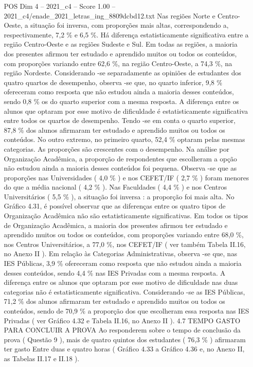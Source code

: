 \begin{textsample}{POS Dim 4 – 2021\_c4 – Score 1.00 – 2021\_c4/enade\_2021\_letras\_ing\_8809dcbd12.txt}
Nas regiões Norte e Centro-Oeste, a situação foi inversa, com proporções mais altas, correspondendo a, respectivamente, 7,2 \% e 6,5 \%.
Há diferença estatisticamente significativa entre a região Centro-Oeste e as regiões Sudeste e Sul.
Em todas as regiões, a maioria dos presentes afirmou ter estudado e aprendido muitos ou todos os conteúdos, com proporções variando entre 62,6 \%, na região Centro-Oeste, a 74,3 \%, na região Nordeste.
Considerando -se separadamente as opiniões de estudantes dos quatro quartos de desempenho, observa -se que, no quarto inferior, 9,8 \% ofereceram como resposta que não estudou ainda a maioria desses conteúdos, sendo 0,8 \% os do quarto superior com a mesma resposta.
A diferença entre os alunos que optaram por esse motivo de dificuldade é estatisticamente significativa entre todos os quartos de desempenho.
Tendo -se em conta o quarto superior, 87,8 \% dos alunos afirmaram ter estudado e aprendido muitos ou todos os conteúdos.
No outro extremo, no primeiro quarto, 52,4 \% optaram pelas mesmas categorias.
As proporções são crescentes com o desempenho.
Na análise por Organização Acadêmica, a proporção de respondentes que escolheram a opção não estudou ainda a maioria desses conteúdos foi pequena.
Observa -se que as proporções nas Universidades ( 4,0 \% ) e nos CEFET/IF ( 2,7 \% ) foram menores do que a média nacional ( 4,2 \% ).
Nas Faculdades ( 4,4 \% ) e nos Centros Universitários ( 5,5 \% ), a situação foi inversa : a proporção foi mais alta.
No Gráfico 4.31, é possível observar que as diferenças entre os quatro tipos de Organização Acadêmica não são estatisticamente significativas.
Em todos os tipos de Organização Acadêmica, a maioria dos presentes afirmou ter estudado e aprendido muitos ou todos os conteúdos, com proporções variando entre 68,0 \%, nos Centros Universitários, a 77,0 \%, nos CEFET/IF ( ver também Tabela II.16, no Anexo II ).
Em relação às Categorias Administrativas, observa -se que, nas IES Públicas, 3,9 \% ofereceram como resposta que não estudou ainda a maioria desses conteúdos, sendo 4,4 \% nas IES Privadas com a mesma resposta.
A diferença entre os alunos que optaram por esse motivo de dificuldade nas duas categorias não é estatisticamente significativa.
Considerando -se as IES Públicas, 71,2 \% dos alunos afirmaram ter estudado e aprendido muitos ou todos os conteúdos, sendo de 70,9 \% a proporção dos que escolheram essa resposta nas IES Privadas ( ver Gráfico 4.32 e Tabela II.16, no Anexo II ). 4.7 TEMPO GASTO PARA CONCLUIR A PROVA Ao responderem sobre o tempo de conclusão da prova ( Questão 9 ), mais de quatro quintos dos estudantes ( 76,3 \% ) afirmaram ter gasto Entre duas e quatro horas ( Gráfico 4.33 a Gráfico 4.36 e, no Anexo II, as Tabelas II.17 e II.18 ).

\end{textsample}
